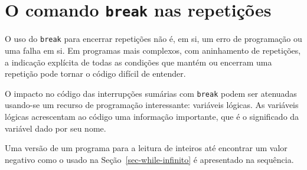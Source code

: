 \documentclass[
  11pt,
  a4paper,
]{scrbook}
\begin{document}
\section{\texorpdfstring{O comando \texttt{break} nas
repetições}{O comando break nas repetições}}\label{o-comando-break-nas-repetiuxe7uxf5es}

O uso do \texttt{break} para encerrar repetições não é, em si, um erro
de programação ou uma falha em si. Em programas mais complexos, com
aninhamento de repetições, a indicação explícita de todas as condições
que mantém ou encerram uma repetição pode tornar o código difícil de
entender.

O impacto no código das interrupções sumárias com \texttt{break} podem
ser atenuadas usando-se um recurso de programação interessante:
variáveis lógicas. As variáveis lógicas acrescentam ao código uma
informação importante, que é o significado da variável dado por seu
nome.

Uma versão de um programa para a leitura de inteiros até encontrar um
valor negativo como o usado na Seção~\ref{sec-while-infinito} é
apresentado na sequência.
\end{document}
